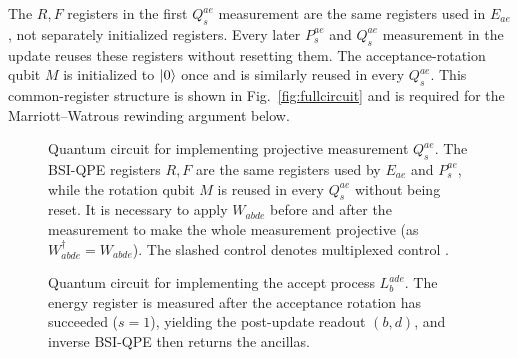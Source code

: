\documentclass[aps,floatfix,10pt,amssymb,amsfont,amsmath,superscriptaddress,float,nofootinbib,longbibliography,nobalancelastpage,twocolumn]{revtex4-2}
\begin{document}
The $R,F$ registers in the first $Q_s^{ae}$ measurement are the same registers used in $E_{ae}$, not separately initialized registers. Every later $P_s^{ae}$ and $Q_s^{ae}$ measurement in the update reuses these registers without resetting them. The acceptance-rotation qubit $M$ is initialized to $\ket{0}$ once and is similarly reused in every $Q_s^{ae}$. This common-register structure is shown in Fig.~\ref{fig:fullcircuit} and is required for the Marriott--Watrous rewinding argument below.
\begin{figure}

\caption{Quantum circuit for implementing projective measurement $Q_s^{ae}$. The BSI-QPE registers $R, F$ are the same registers used by $E_{ae}$ and $P_s^{ae}$, while the rotation qubit $M$ is reused in every $Q_s^{ae}$ without being reset. It is necessary to apply $W_{abde}$ before and after the measurement to make the whole measurement projective (as $W_{abde}^{\dagger}=W_{abde}$). The slashed control denotes multiplexed control \cite{low2024trading}.}
\label{fig:Qcircuit}
\end{figure}

\begin{figure}

\caption{Quantum circuit for implementing the accept process $L_b^{ade}$. The energy register is measured after the acceptance rotation has succeeded ($s=1$), yielding the post-update readout $(b,d)$, and inverse BSI-QPE then returns the ancillas.}
\label{fig:LQ_circuit}
\end{figure}
\end{document}
